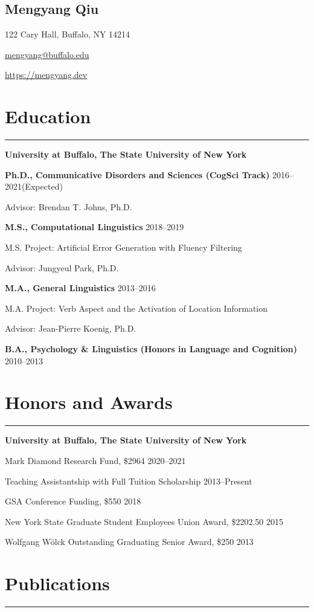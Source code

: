 \documentclass[11pt]{article}
\newcommand{\name}[1]{\begin{center}\section*{\Huge #1}\end{center}}
\newcommand{\topinfo}[1]{\begin{center}\vspace{-0.2cm}#1\vspace{-0.2cm}\end{center}}
\newcommand{\resumesection}[1]{\vspace{-0.2cm}\section*{#1}\vspace{-0.2cm}\hrule\vspace{0.2cm}}
\begin{document}
\name{Mengyang Qiu}
\topinfo{122 Cary Hall, Buffalo, NY 14214}
\topinfo{\href{mailto:mengyang@buffalo.edu}{mengyang@buffalo.edu}}
\topinfo{\url{https://mengyang.dev}}

\resumesection{Education}
\textbf{University at Buffalo, The State University of New York}

\textbf{Ph.D., Communicative Disorders and Sciences (CogSci Track)} \hfill 2016--2021(Expected)

\quad Advisor: Brendan T. Johns, Ph.D.

\textbf{M.S., Computational Linguistics} \hfill 2018--2019

\quad M.S. Project: Artificial Error Generation with Fluency Filtering

\quad Advisor: Jungyeul Park, Ph.D.

\textbf{M.A., General Linguistics} \hfill 2013--2016

\quad M.A. Project: Verb Aspect and the Activation of Location Information

\quad Advisor: Jean-Pierre Koenig, Ph.D.

\textbf{B.A., Psychology \& Linguistics (Honors in Language and Cognition)} \hfill 2010--2013


\resumesection{Honors and Awards}
\textbf{University at Buffalo, The State University of New York}

Mark Diamond Research Fund, \$2964 \hfill 2020--2021

Teaching Assistantship with Full Tuition Scholarship \hfill 2013--Present

GSA Conference Funding, \$550 \hfill 2018

New York State Graduate Student Employees Union Award, \$2202.50 \hfill 2015

Wolfgang W{\"o}lck Outstanding Graduating Senior Award, \$250 \hfill 2013


\resumesection{Publications}
\end{document}
